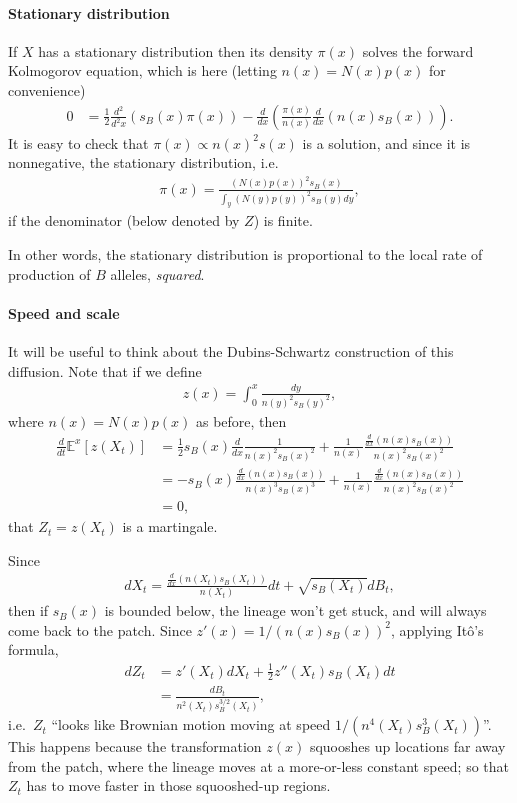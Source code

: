 \documentclass{article}
\newcommand{\E}{\mathbb{E}}
\newcommand{\deriv}[1]{\frac{d}{d#1}}
\newcommand{\dderiv}[1]{\frac{d^2}{d^2#1}}
\begin{document}
\paragraph{Stationary distribution}
If $X$ has a stationary distribution then its density $\pi(x)$ solves the forward Kolmogorov equation,
which is here (letting $n(x) = N(x) p(x)$ for convenience)
\begin{align}
  0 &= \frac{1}{2} \dderiv{x} \left( s_B(x) \pi(x) \right) - \deriv{x} \left( \frac{\pi(x)}{n(x)} \deriv{x}(n(x) s_B(x)) \right) .
\end{align}
It is easy to check that $\pi(x) \propto n(x)^2 s(x) $ is a solution,
and since it is nonnegative, the stationary distribution,
i.e.
\begin{align}
  \pi(x) = \frac{ \left( N(x) p(x) \right)^2 s_B(x) }{ \int_y \left( N(y) p(y) \right)^2 s_B(y) dy } ,
\end{align}
if the denominator (below denoted by $Z$) is finite.

In other words, the stationary distribution is proportional to the local rate of production of $B$ alleles, \emph{squared}.


\paragraph{Speed and scale}
It will be useful to think about the Dubins-Schwartz construction of this diffusion.
Note that if we define
\begin{align}
  z(x) = \int_{0}^x \frac{ dy }{ n(y)^2 s_B(y)^2 },
\end{align}
where $n(x) = N(x) p(x)$ as before,
then
\begin{align}
  \deriv{t} \E^x[z(X_t)] &= \frac{1}{2} s_B(x) \deriv{x} \frac{1}{ n(x)^2 s_B(x)^2 } + \frac{1}{n(x)} \frac{ \deriv{x}(n(x)s_B(x)) }{  n(x)^2 s_B(x)^2 } \\
  &= - s_B(x) \frac{ \deriv{x} (n(x)s_B(x)) }{ n(x)^3 s_B(x)^3 } + \frac{1}{n(x)} \frac{ \deriv{x}(n(x)s_B(x)) }{  n(x)^2 s_B(x)^2 } \\
  &= 0 ,
\end{align}
that $Z_t = z(X_t)$ is a martingale.

Since
\begin{align}
  dX_t = \frac{\deriv{x}(n(X_t)s_B(X_t))}{n(X_t)} dt + \sqrt{s_B(X_t)} dB_t,
\end{align}
then if $s_B(x)$ is bounded below, the lineage won't get stuck,
and will always come back to the patch.
Since $z'(x) = 1/(n(x)s_B(x))^2$,
applying It\^o's formula,
\begin{align}
  dZ_t &=  z'(X_t) dX_t + \frac{1}{2} z''(X_t) s_B(X_t) dt \\
  &= \frac{ dB_t }{ n^2(X_t) s_B^{3/2}(X_t) } ,
\end{align}
i.e.\ $Z_t$ ``looks like Brownian motion moving at speed $1/(n^4(X_t) s_B^3(X_t))$''.
This happens because the transformation $z(x)$ squooshes up locations far away from the patch,
where the lineage moves at a more-or-less constant speed;
so that $Z_t$ has to move faster in those squooshed-up regions.
\end{document}
